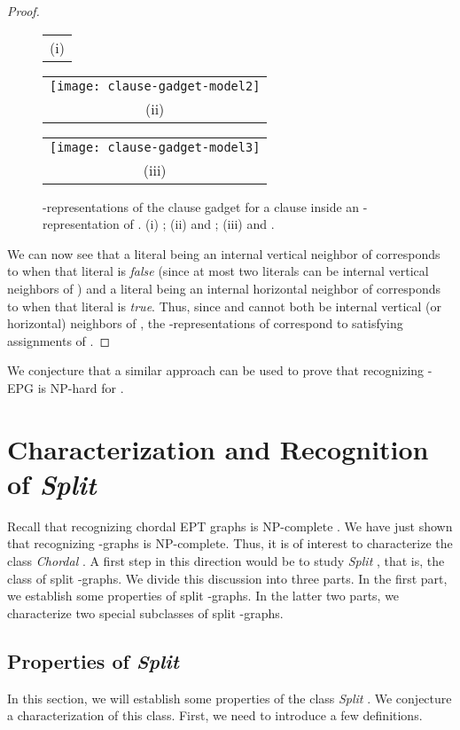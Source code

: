 \documentclass[11pt,3p,times]{elsarticle}
\newenvironment{myproof}{\begin{proof}}{\end{proof}}
\begin{document}
\begin{myproof}
\begin{figure}[h]
\begin{tabular}{c}
(i)
\end{tabular}
\hfill
\begin{tabular}{c}
\texttt{[image: clause-gadget-model2]} \\
(ii)
\end{tabular}
\hfill
\begin{tabular}{c}
\texttt{[image: clause-gadget-model3]} \\
(iii)
\end{tabular}
\caption{-representations of the clause gadget for a clause
 inside an -representation of
. (i) ; (ii)  and ; (iii)  and .} \label{fig:clause-gadget}
\end{figure}
We can now see that a literal being an internal vertical neighbor
of  corresponds to when that literal is \emph{false} (since at
most two literals can be internal vertical neighbors of ) and a
literal being an internal horizontal neighbor of  corresponds
to when that literal is \emph{true}. Thus, since  and
 cannot both be internal vertical (or horizontal)
neighbors of , the -representations of 
 correspond to satisfying assignments of .
\end{myproof}




\noindent We conjecture that a similar approach can be used to prove
that recognizing -EPG is NP-hard for . 


\section{Characterization and Recognition of {\em Split}  }
\label{sec:split}
Recall that recognizing chordal EPT graphs is NP-complete \cite{Gol1985}. We have
just shown that recognizing -graphs is NP-complete. Thus,
it is of interest to characterize the class {\em Chordal} . A first step in this direction would be to study {\em
Split} , that is, the class of split
-graphs. We divide this discussion into three parts. In the
first part, we establish some properties of split -graphs.
In the latter two parts, we characterize two special subclasses of
split -graphs.
\subsection{Properties of {\em Split}  }
\label{sec:properties-of-split}
In this section, we will establish some properties of the class
{\em Split} . We conjecture a
characterization of this class. First, we need to introduce a few
definitions.
\end{document}
